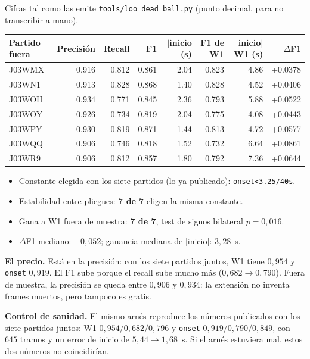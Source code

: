 \documentclass[11pt,a4paper]{article}
\begin{document}
Cifras tal como las emite \texttt{tools/loo\_dead\_ball.py} (punto decimal, para no
transcribir a mano).

\begin{center}
\begin{tabular}{@{}lrrrrrrr@{}}
\hline
Partido fuera & Precisión & Recall & F1 & $|$inicio$|$ (s) & F1 de W1 & $|$inicio$|$ W1 (s) & $\Delta$F1 \\
\hline
J03WMX & 0.916 & 0.812 & 0.861 & 2.04 & 0.823 & 4.86 & +0.0378 \\
J03WN1 & 0.913 & 0.828 & 0.868 & 1.40 & 0.828 & 4.52 & +0.0406 \\
J03WOH & 0.934 & 0.771 & 0.845 & 2.36 & 0.793 & 5.88 & +0.0522 \\
J03WOY & 0.926 & 0.734 & 0.819 & 2.04 & 0.775 & 4.08 & +0.0443 \\
J03WPY & 0.930 & 0.819 & 0.871 & 1.44 & 0.813 & 4.72 & +0.0577 \\
J03WQQ & 0.906 & 0.746 & 0.818 & 1.52 & 0.732 & 6.64 & +0.0861 \\
J03WR9 & 0.906 & 0.812 & 0.857 & 1.80 & 0.792 & 7.36 & +0.0644 \\
\hline
\end{tabular}
\end{center}

\begin{itemize}
\item Constante elegida con los siete partidos (lo ya publicado): \texttt{onset<3.25/40s}.
\item Estabilidad entre pliegues: \textbf{7 de 7} eligen la misma constante.
\item Gana a W1 fuera de muestra: \textbf{7 de 7}, test de signos bilateral $p=0{,}016$.
\item $\Delta$F1 mediano: $+0{,}052$; ganancia mediana de $|$inicio$|$: $3{,}28$~s.
\end{itemize}

\textbf{El precio.} Está en la precisión: con los siete partidos juntos, W1 tiene $0{,}954$ y
\texttt{onset} $0{,}919$. El F1 sube porque el recall sube mucho más ($0{,}682 \rightarrow
0{,}790$). Fuera de muestra, la precisión se queda entre $0{,}906$ y $0{,}934$: la extensión no
inventa frames muertos, pero tampoco es gratis.

\textbf{Control de sanidad.} El mismo arnés reproduce los números publicados con los siete
partidos juntos: W1 $0{,}954/0{,}682/0{,}796$ y \texttt{onset} $0{,}919/0{,}790/0{,}849$, con
$645$ tramos y un error de inicio de $5{,}44 \rightarrow 1{,}68$~s. Si el arnés estuviera mal,
estos dos números no coincidirían.
\end{document}
